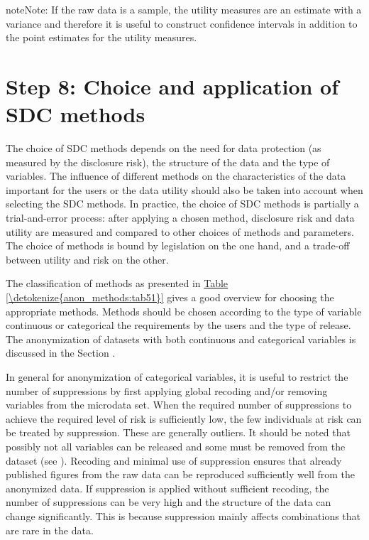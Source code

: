 \documentclass[letterpaper,10pt,english]{sphinxmanual}
\begin{document}
\begin{sphinxadmonition}{note}{Note:}
If the raw data is a sample,
the utility measures are an estimate with a variance and therefore it is
useful to construct confidence intervals in addition to the point
estimates for the utility measures.
\end{sphinxadmonition}


\section{Step 8: Choice and application of SDC methods}
\label{\detokenize{process:step-8-choice-and-application-of-sdc-methods}}
The choice of SDC methods depends on the need for data protection (as
measured by the disclosure risk), the structure of the data and the type
of variables. The influence of different methods on the characteristics
of the data important for the users or the data utility should also be
taken into account when selecting the SDC methods. In practice, the
choice of SDC methods is partially a trial-and-error process: after
applying a chosen method, disclosure risk and data utility are measured
and compared to other choices of methods and parameters. The choice of
methods is bound by legislation on the one hand, and a trade-off between
utility and risk on the other.

The classification of methods as presented in \hyperref[\detokenize{anon_methods:tab51}]{Table \ref{\detokenize{anon_methods:tab51}}} gives a good
overview for choosing the appropriate methods. Methods should be chosen
according to the type of variable \textendash{} continuous or categorical \textendash{} the
requirements by the users and the type of release. The anonymization of
datasets with both continuous and categorical variables is discussed in
the Section .

In general for anonymization of categorical variables, it is useful to
restrict the number of suppressions by first applying global recoding
and/or removing variables from the microdata set. When the required
number of suppressions to achieve the required level of risk is
sufficiently low, the few individuals at risk can be treated by
suppression. These are generally outliers. It should be noted that
possibly not all variables can be released and some must be removed from
the dataset (see {\hyperref[\detokenize{process:step-2-data-preparation-and-exploring-data-characteristics}]{}}
). Recoding and minimal use of suppression
ensures that already published figures from the raw data can be
reproduced sufficiently well from the anonymized data. If suppression is
applied without sufficient recoding, the number of suppressions can be
very high and the structure of the data can change significantly. This
is because suppression mainly affects combinations that are rare in the
data.
\end{document}
